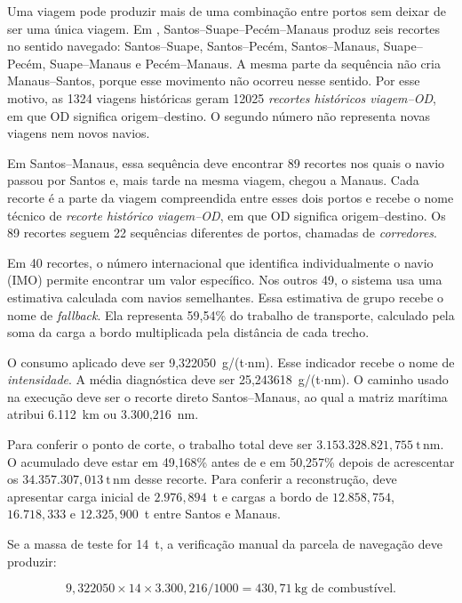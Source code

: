 Uma viagem pode produzir mais de uma combinação entre portos sem deixar de ser uma única viagem. Em , Santos--Suape--Pecém--Manaus produz seis recortes no sentido navegado: Santos--Suape, Santos--Pecém, Santos--Manaus, Suape--Pecém, Suape--Manaus e Pecém--Manaus. A mesma parte da sequência não cria Manaus--Santos, porque esse movimento não ocorreu nesse sentido. Por esse motivo, as \num{1324} viagens históricas geram \num{12025} \emph{recortes históricos viagem--OD}, em que OD significa origem--destino. O segundo número não representa novas viagens nem novos navios.

Em Santos--Manaus, essa sequência deve encontrar 89 recortes nos quais o navio passou por Santos e, mais tarde na mesma viagem, chegou a Manaus. Cada recorte é a parte da viagem compreendida entre esses dois portos e recebe o nome técnico de \emph{recorte histórico viagem--OD}, em que OD significa origem--destino. Os 89 recortes seguem 22 sequências diferentes de portos, chamadas de \emph{corredores}.

Em 40 recortes, o número internacional que identifica individualmente o navio (IMO) permite encontrar um valor específico. Nos outros 49, o sistema usa uma estimativa calculada com navios semelhantes. Essa estimativa de grupo recebe o nome de \emph{fallback}. Ela representa 59,54\% do trabalho de transporte, calculado pela soma da carga a bordo multiplicada pela distância de cada trecho.

O consumo aplicado deve ser 9,322050~g/(t$\cdot$nm). Esse indicador recebe o nome de \emph{intensidade}. A média diagnóstica deve ser 25,243618~g/(t$\cdot$nm). O caminho usado na execução deve ser o recorte direto Santos--Manaus, ao qual a matriz marítima atribui 6.112~km ou 3.300,216~nm.

Para conferir o ponto de corte, o trabalho total deve ser \(3.153.328.821{,}755~\mathrm{t\,nm}\). O acumulado deve estar em 49,168\% antes de  e em 50,257\% depois de acrescentar os \(34.357.307{,}013~\mathrm{t\,nm}\) desse recorte. Para conferir a reconstrução,  deve apresentar carga inicial de \(2.976{,}894\)~t e cargas a bordo de \(12.858{,}754\), \(16.718{,}333\) e \(12.325{,}900\)~t entre Santos e Manaus.

Se a massa de teste for 14~t, a verificação manual da parcela de navegação deve produzir:

\begin{equation}
9{,}322050\times14\times3.300{,}216/1000
= 430{,}71~\text{kg de combustível}.
\end{equation}

